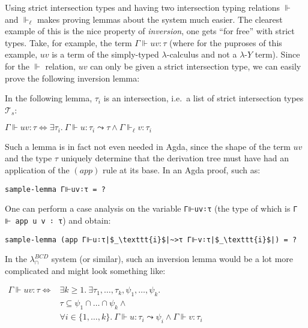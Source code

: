 \documentclass[a4paper, 12pt, twoside]{style/ociamthesis}
\theoremstyle{plain}
\newtheorem{Lemma}{Lemma}[chapter]
\theoremstyle{definition}
\theoremstyle{remark}
\newtheorem*{Remark}{Remark}
\newcommand{\lamy}{\lambda\text{-}Y}
\renewenvironment{Remark}{\begin{OldRemark}\begin{mdframed}[style=example, linecolor=black]}{\end{mdframed}\end{OldRemark}}
\renewenvironment{Lemma}{\begin{OldLemma}\begin{mdframed}[style=example, linecolor=cyan]}{\end{mdframed}\end{OldLemma}}
\begin{document}
\begin{Remark}

Using strict intersection types and having two intersection typing
relations \(\Vdash\) and \(\Vdash_\ell\) makes proving lemmas about the
system much easier. The clearest example of this is the nice property of
\emph{inversion}, one gets ``for free'' with strict types. Take, for
example, the term \(\Gamma \Vdash uv : \tau\) (where for the puproses of
this example, \(uv\) is a term of the simply-typed \(\lambda\)-calculus
and not a \(\lamy\) term). Since for the \(\Vdash\) relation, \(uv\) can
only be given a strict intersection type, we can easily prove the
following inversion lemma:

\begin{Lemma}[Inversion Lemma for $(app)$]

\label{Lemma:invApp} In the following lemma, \(\tau_i\) is an
intersection, i.e.~a list of strict intersection types
\(\mathcal{T}_s\):

\begin{center}
$\Gamma \Vdash uv : \tau \iff \exists \tau_i.\ \Gamma \Vdash u : \tau_i \leadsto \tau \land \Gamma \Vdash_\ell v : \tau_i$
\end{center}

\end{Lemma}

Such a lemma is in fact not even needed in Agda, since the shape of the
term \(uv\) and the type \(\tau\) uniquely determine that the derivation
tree must have had an application of the \((app)\) rule at its base. In
an Agda proof, such as:

\begin{verbatim}
sample-lemma Γ⊩uv∶τ = ?
\end{verbatim}

One can perform a case analysis on the variable \texttt{Γ⊩uv∶τ} (the
type of which is \texttt{Γ ⊩ app u v ∶ τ}) and obtain:

\begin{verbatim}
sample-lemma (app Γ⊩u∶τ|$_\texttt{i}$|~>τ Γ⊩v∶τ|$_\texttt{i}$|) = ?
\end{verbatim}

In the \(\lambda_\cap^{BCD}\) system (or similar), such an inversion
lemma would be a lot more complicated and might look something like:

\begin{center}
$\begin{aligned}
\Gamma \Vdash uv : \tau \iff &\exists k \geq 1.\ \exists \tau_1,\hdots,\tau_k,\psi_1,\hdots,\psi_k.\\
&\tau \subseteq \psi_1 \cap \hdots \cap \psi_k \land\\
&\forall i \in \{1,\hdots,k\}.\ \Gamma \Vdash u : \tau_i \leadsto \psi_i \land \Gamma \Vdash v : \tau_i
\end{aligned}$
\end{center}


\end{Remark}
\end{document}

